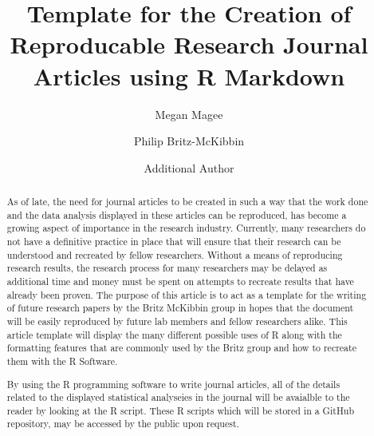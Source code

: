 \documentclass[]{elsarticle} %
\begin{document}
\begin{frontmatter}

  \title{Template for the Creation of Reproducable Research Journal Articles
using R Markdown}
    \author[Some Institute of Technology]{Megan Magee}
    \author[Another University]{Philip Britz-McKibbin}
  
    \author[Again Another University]{Additional Author}
  
  
      \address[Some Institute of Technology]{McMaster University, Department of Chemistry and Chemical Biology, Main
St W, Hamilton, ON, L8S 4L8}
    \address[Another University]{McMaster University, Department of Chemsitry and Chemical Biology, Main
St W, Hamilton, ON, L8S 4L8}
    \address[Again Another University]{McMaster Children's Hospital, Main St W, Hamilton, ON, L8N 3Z5}
  
  \begin{abstract}
  As of late, the need for journal articles to be created in such a way
  that the work done and the data analysis displayed in these articles can
  be reproduced, has become a growing aspect of importance in the research
  industry. Currently, many researchers do not have a definitive practice
  in place that will ensure that their research can be understood and
  recreated by fellow researchers. Without a means of reproducing research
  results, the research process for many researchers may be delayed as
  additional time and money must be spent on attempts to recreate results
  that have already been proven. The purpose of this article is to act as
  a template for the writing of future research papers by the Britz
  McKibbin group in hopes that the document will be easily reproduced by
  future lab members and fellow researchers alike. This article template
  will display the many different possible uses of R along with the
  formatting features that are commonly used by the Britz group and how to
  recreate them with the R Software.
  
  By using the R programming software to write journal articles, all of
  the details related to the displayed statistical analyseies in the
  journal will be avaialble to the reader by looking at the R script.
  These R scripts which will be stored in a GitHub repository, may be
  accessed by the public upon request.
  \end{abstract}
  
 \end{frontmatter}
\end{document}

